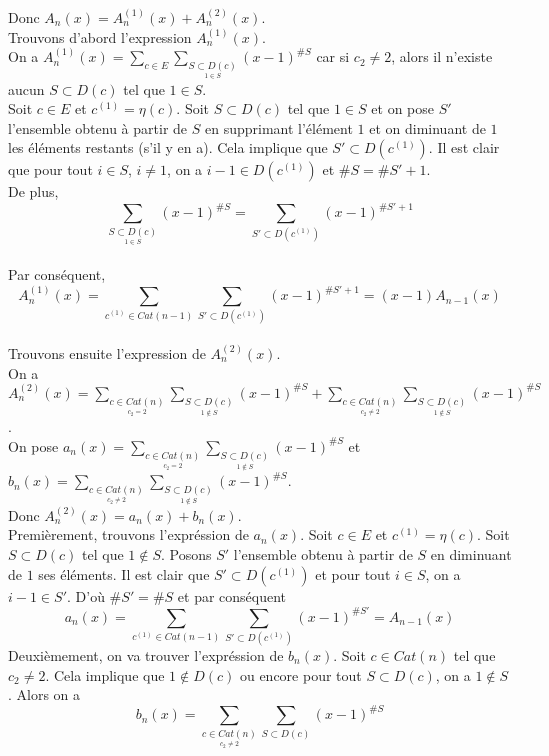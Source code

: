 Donc $A_{n}(x) = A_{n}^{(1)}(x) + A_{n}^{(2)}(x)$.\vspace{15pt}\\
Trouvons d'abord l'expression $A_{n}^{(1)}(x)$.\\
On a $A_{n}^{(1)}(x) = \sum\limits_{c \in E}\sum\limits_{\underset{1\in S}{S\subset D(c)}}(x-1)^{{\#S}}$ car si $c_{2}\neq 2$, alors il n'existe aucun $S\subset D(c)$ tel que $1\in S$. \\
Soit $c\in E$ et $c^{(1)}=\eta(c)$. Soit $S\subset D(c)$ tel que $1\in S$ et on pose $S'$ l'ensemble obtenu à partir de $S$ en supprimant l'élément $1$ et on diminuant de $1$ les éléments restants (s'il y en a). Cela implique que $S'\subset D(c^{(1)})$.
Il est clair que pour tout $i \in S$, $i \neq 1$, on a $i-1 \in  D(c^{(1)})$ et $\#S = \#S' + 1$.\\
De plus, $$\sum \limits_{\underset{1\in S}{S\subset D(c)}}(x-1)^{\#S} = \sum \limits_{S'\subset D(c^{(1)})}(x-1)^{\#S' + 1}$$\\
Par conséquent, $$A_{n}^{(1)}(x)=\sum\limits_{c^{(1)}\in Cat(n-1)}\sum \limits_{S'\subset D(c^{(1)})}(x-1)^{\#S' + 1}=(x-1)A_{n-1}(x)$$\vspace{15pt}\\
Trouvons ensuite l'expression de $A_{n}^{(2)}(x)$.\\
On a $A_{n}^{(2)}(x) = \sum\limits_{\underset{c_{2}=2}{c\in Cat(n)}} \sum\limits_{\underset{1\notin S}{S\subset D(c)}}(x-1)^{\#S} + \sum\limits_{\underset{c_{2}\neq 2}{c\in Cat(n)}} \sum\limits_{\underset{1\notin S}{S\subset D(c)}}(x-1)^{\#S}$.\\
On pose $a_{n}(x)=\sum\limits_{\underset{c_{2}=2}{c\in Cat(n)}} \sum\limits_{\underset{1\notin S}{S\subset D(c)}}(x-1)^{\#S}$ et $b_{n}(x) = \sum\limits_{\underset{c_{2}\neq 2}{c\in Cat(n)}} \sum\limits_{\underset{1\notin S}{S\subset D(c)}}(x-1)^{\#S}$.\\
Donc $A_{n}^{(2)}(x)=a_{n}(x)+b_{n}(x)$.\\
Premièrement, trouvons l'expréssion de $a_{n}(x)$. Soit $c \in E$ et $c^{(1)} = \eta(c)$. Soit $S\subset D(c)$ tel que $1\notin S$. Posons $S'$ l'ensemble obtenu à partir de $S$ en diminuant de $1$ ses éléments. Il est clair que $S'\subset D(c^{(1)})$ et pour tout $i\in S$, on a $i-1\in S'$. D'où $\#S' = \#S$ et par conséquent $$a_{n}(x) = \sum\limits_{c^{(1)}\in Cat(n-1)} \sum\limits_{S'\subset D(c^{(1)})}(x-1)^{\#S'}=A_{n-1}(x)$$
Deuxièmement, on va trouver l'expréssion de $b_{n}(x)$. Soit $c\in Cat(n)$ tel que $c_{2}\neq 2$. Cela implique que $1\notin D(c)$ ou encore pour tout $S\subset D(c)$, on a $1\notin S$. Alors on a $$b_{n}(x) = \sum\limits_{\underset{c_{2}\neq 2}{c\in Cat(n)}} \sum\limits_{S\subset D(c)}(x-1)^{\#S}$$\\
